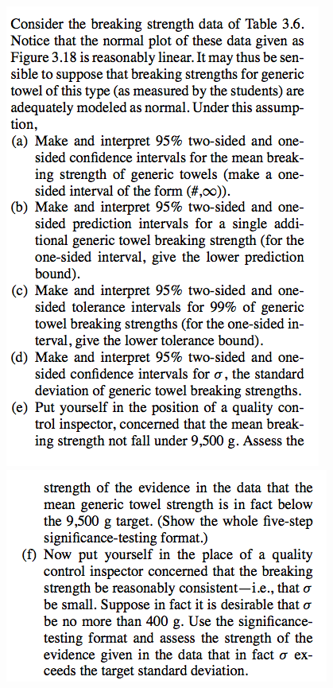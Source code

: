 \documentclass{article}\usepackage{graphicx, color}
\numberwithin{equation}{section}
\begin{document}
\begin{flushleft}
\begin{enumerate}[1. ]
 \includegraphics{../../fig/finalreviewp1-1.png}
 \includegraphics{../../fig/finalreviewp1-2.png}

\end{enumerate}
\end{flushleft}
\end{document}
